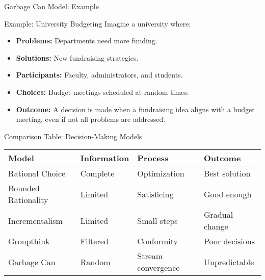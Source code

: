 \documentclass[10pt]{beamer}
\begin{document}
\begin{frame}{Garbage Can Model: Example}
\begin{block}{Example: University Budgeting}
Imagine a university where:
\begin{itemize}
  \item \textbf{Problems:} Departments need more funding.
  \item \textbf{Solutions:} New fundraising strategies.
  \item \textbf{Participants:} Faculty, administrators, and students.
  \item \textbf{Choices:} Budget meetings scheduled at random times.
  \item \textbf{Outcome:} A decision is made when a fundraising idea aligns with a budget meeting, even if not all problems are addressed.
\end{itemize}
\end{block}
\end{frame}

\begin{frame}{Comparison Table: Decision-Making Models}
\begin{tabularx}{\textwidth}{l X X X}
\toprule
\textbf{Model} & \textbf{Information} & \textbf{Process} & \textbf{Outcome} \\
\midrule
Rational Choice & Complete & Optimization & Best solution \\
Bounded Rationality & Limited & Satisficing & Good enough \\
Incrementalism & Limited & Small steps & Gradual change \\
Groupthink & Filtered & Conformity & Poor decisions \\
Garbage Can & Random & Stream convergence & Unpredictable \\
\bottomrule
\end{tabularx}
\end{frame}
\end{document}
